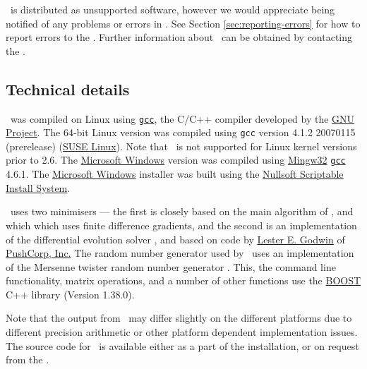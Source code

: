 \SPM\ is distributed as unsupported software, however we would appreciate being notified of any problems or errors in \SPM. See Section \ref{sec:reporting-errors} for how to report errors to the \authors. Further information about \SPM\ can be obtained by contacting the \authors.

\subsection{Technical details}

\SPM\ was compiled on Linux using \href{http://gcc.gnu.org}{\texttt{gcc}}, the C/C++ compiler developed by the \href{http://gcc.gnu.org}{GNU Project}. The 64-bit Linux  version was compiled using \texttt{gcc} version 4.1.2 20070115 (prerelease) (\href{http://www.opensuse.org/}{SUSE Linux}). Note that \SPM\ is not supported for Linux kernel versions prior to 2.6. The \href{http://www.microsoft.com}{Microsoft Windows} version was compiled using \href{http://www.mingw.org}{Mingw32} \href{http://gcc.gnu.org}{\texttt{gcc}} 4.6.1. The \href{http://www.microsoft.com}{Microsoft Windows} installer was built using the \href{http://nsis.sourceforge.net/Main_Page}{Nullsoft Scriptable Install System}.

\SPM\ uses two minimisers --- the first is closely based on the main algorithm of \cite{779}, and which which uses finite difference gradients, and the second is an implementation of the differential evolution solver \citep{1442}, and based on code by \href{mailto:<godwin@pushcorp.com>}{Lester E. Godwin} of \href{http://www.pushcorp.com}{PushCorp, Inc.} The random number generator used by \SPM\ uses an implementation of the Mersenne twister random number generator \citep{796}. This, the command line functionality, matrix operations, and a number of other functions use the \href{http://www.boost.org/}{BOOST} C++ library (Version 1.38.0).

Note that the output from \SPM\ may differ slightly on the different platforms due to different precision arithmetic or other platform dependent implementation issues. The source code for \SPM\ is available either as a part of the installation, or on request from the \authors.


